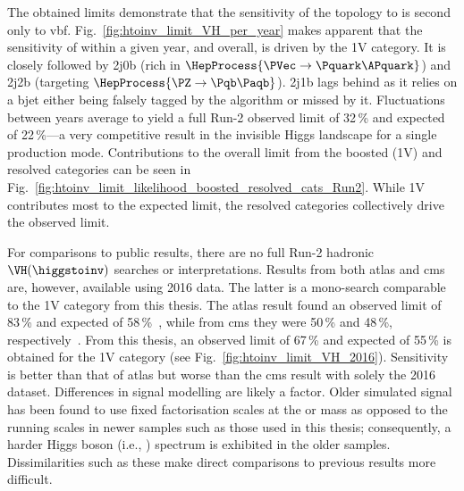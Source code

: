 The obtained limits demonstrate that the sensitivity of the \VH topology to \higgstoinv is second only to \acrshort{vbf}. Fig.~\ref{fig:htoinv_limit_VH_per_year} makes apparent that the sensitivity of \VH within a given year, and overall, is driven by the 1V category. It is closely followed by 2j0b (rich in $\HepProcess{\PVec \to \Pquark\APquark}$) and 2j2b (targeting $\HepProcess{\PZ \to \Pqb\Paqb}$). 2j1b lags behind as it relies on a \gls{bjet} either being falsely tagged by the \deepcsv algorithm or missed by it. Fluctuations between years average to yield a full Run-2 observed limit of 32\,\% and expected of 22\,\%---a very competitive result in the invisible Higgs landscape for a single production mode. Contributions to the overall limit from the boosted (1V) and resolved categories can be seen in Fig.~\ref{fig:htoinv_limit_likelihood_boosted_resolved_cats_Run2}. While 1V contributes most to the expected limit, the resolved categories collectively drive the observed limit.

For comparisons to public results, there are no full Run-2 hadronic $\VH(\higgstoinv)$ searches or interpretations. Results from both \acrshort{atlas} and \acrshort{cms} are, however, available using 2016 data. The latter is a mono-\PVec search comparable to the 1V category from this thesis. The \acrshort{atlas} \VH result found an observed limit of 83\,\% and expected of 58\,\%~\cite{Aaboud:2018xdl}, while from \acrshort{cms} they were 50\,\% and 48\,\%, respectively~\cite{Sirunyan:2017jix}. From this thesis, an observed limit of 67\,\% and expected of 55\,\% is obtained for the 1V category (see Fig.~\ref{fig:htoinv_limit_VH_2016}). Sensitivity is better than that of \acrshort{atlas} but worse than the \acrshort{cms} result with solely the 2016 dataset. Differences in signal modelling are likely a factor. Older simulated signal has been found to use fixed factorisation scales at the \PW or \PH mass as opposed to the running scales in newer samples such as those used in this thesis; consequently, a harder Higgs boson \pt (i.e., \ptmiss) spectrum is exhibited in the older samples. Dissimilarities such as these make direct comparisons to previous results more difficult.


